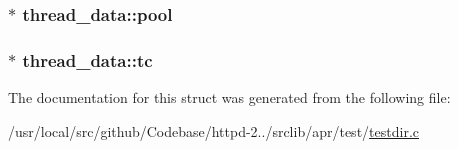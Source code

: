 \subsubsection[{\texorpdfstring{pool}{pool}}]{$\ast$ thread\+\_\+data\+::pool}\hypertarget{structthread__data_a93122c8e067656f337610091e15b9eb1}{}\label{structthread__data_a93122c8e067656f337610091e15b9eb1}
\subsubsection[{\texorpdfstring{tc}{tc}}]{$\ast$ thread\+\_\+data\+::tc}\hypertarget{structthread__data_a7861c2b5f37bf9c92bc4713eb0374095}{}\label{structthread__data_a7861c2b5f37bf9c92bc4713eb0374095}


The documentation for this struct was generated from the following file\+:\begin{DoxyCompactItemize}
\item 
/usr/local/src/github/\+Codebase/httpd-\/2../srclib/apr/test/\hyperlink{testdir_8c}{testdir.\+c}\end{DoxyCompactItemize}
